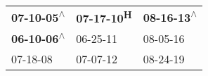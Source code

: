 \begin{supertabular}{lll}
 \textbf{07-10-05\textsuperscript{$\wedge$}} &  \textbf{07-17-10\textsuperscript{H}} &  \textbf{08-16-13\textsuperscript{$\wedge$}} \\
 \textbf{06-10-06\textsuperscript{$\wedge$}} &            06-25-11\textsuperscript{} &                   08-05-16\textsuperscript{} \\
                  07-18-08\textsuperscript{} &            07-07-12\textsuperscript{} &                   08-24-19\textsuperscript{} \\
\end{supertabular}
